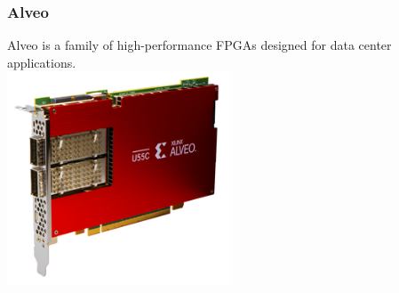 \documentclass{beamer}
\begin{document}
\begin{frame}\frametitle{Alveo}
Alveo is a family of high-performance FPGAs designed 
for data center applications. \\
\vspace{1cm}
\centering
\includegraphics[width=0.5\textwidth]{alveou55c.png}
\end{frame}
\end{document}
